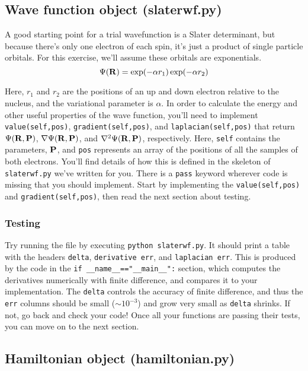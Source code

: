 \documentclass[12pt]{article}
\newcommand{\bR}{{\bf R}}
\newcommand{\bP}{{\bf P}}
\begin{document}
\subsection{Wave function object (slaterwf.py)}

A good starting point for a trial wavefunction is a Slater determinant, but because there's only one electron of each spin, it's just a product of single particle orbitals. 
For this exercise, we'll assume these orbitals are exponentials.
\begin{equation}
\Psi(\bR)=\exp(-\alpha r_1) \exp(-\alpha r_2)	
\end{equation}

Here, $r_1$ and $r_2$ are the positions of an up and down electron relative to the nucleus, and the variational parameter is $\alpha$.
In order to calculate the energy and other useful properties of the wave function, you'll need to implement \verb|value(self,pos)|, \verb|gradient(self,pos)|, and \verb|laplacian(self,pos)| that return $\Psi(\bR,\bP)$, $\nabla \Psi(\bR,\bP)$, and $\nabla^2 \Psi(\bR,\bP)$, respectively. 
Here, \verb|self| contains the parameters, $\bP$, and \verb|pos| represents an array of the positions of all the samples of both electrons. 
You'll find details of how this is defined in the skeleton of \verb|slaterwf.py| we've written for you.
There is a \verb|pass| keyword wherever code is missing that you should implement. 
Start by implementing the \verb|value(self,pos)| and \verb|gradient(self,pos)|, then read the next section about testing.

\subsubsection{Testing}

Try running the file by executing \verb|python slaterwf.py|. 
It should print a table with the headers \verb|delta|, \verb|derivative err|, and \verb|laplacian err|. 
This is produced by the code in the \verb|if __name__=="__main__":| section, which computes the derivatives numerically with finite difference, and compares it to your implementation. 
The \verb|delta| controls the accuracy of finite difference, and thus the \verb|err| columns should be small ($\sim 10^{-3}$) and grow very small as \verb|delta| shrinks.
If not, go back and check your code!
Once all your functions are passing their tests, you can move on to the next section.

\subsection{Hamiltonian object (hamiltonian.py)}
\end{document}
